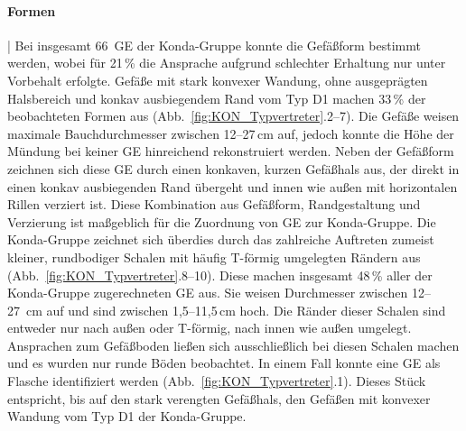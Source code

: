 \paragraph{Formen}\hspace{-.5em}|\hspace{.5em}%
Bei insgesamt 66~GE der Konda-Gruppe konnte die Gefäßform bestimmt werden, wobei für 21\,\% die Ansprache aufgrund schlechter Erhaltung nur unter Vorbehalt erfolgte. Gefäße mit stark konvexer Wandung, ohne ausgeprägten Halsbereich und konkav ausbiegendem Rand vom Typ D1 machen 33\,\% der beobachteten Formen aus (Abb.~\ref{fig:KON_Typvertreter}.2--7). Die Gefäße weisen maximale Bauchdurchmesser zwischen 12--27\,cm auf, jedoch konnte die Höhe der Mündung bei keiner GE hinreichend rekonstruiert werden. Neben der Gefäßform zeichnen sich diese GE durch einen konkaven, kurzen Gefäßhals aus, der direkt in einen konkav ausbiegenden Rand übergeht und innen wie außen mit horizontalen Rillen verziert ist. Diese Kombination aus Gefäßform, Randgestaltung und Verzierung ist maßgeblich für die Zuordnung von GE zur Konda-Gruppe. Die Konda-Gruppe zeichnet sich überdies durch das zahlreiche Auftreten zumeist kleiner, rundbodiger Schalen mit häufig T-förmig umgelegten Rändern aus (Abb.~\ref{fig:KON_Typvertreter}.8--10). Diese machen insgesamt 48\,\% aller der Konda-Gruppe zugerechneten GE aus. Sie weisen Durchmesser zwischen 12--27~cm auf und sind zwischen 1,5--11,5\,cm hoch. Die Ränder dieser Schalen sind entweder nur nach außen oder T-förmig, nach innen wie außen umgelegt. Ansprachen zum Gefäßboden ließen sich ausschließlich bei diesen Schalen machen und es wurden nur runde Böden beobachtet. In einem Fall konnte eine GE als Flasche identifiziert werden (Abb.~\ref{fig:KON_Typvertreter}.1). Dieses Stück entspricht, bis auf den stark verengten Gefäßhals, den Gefäßen mit konvexer Wandung vom Typ D1 der Konda-Gruppe.


